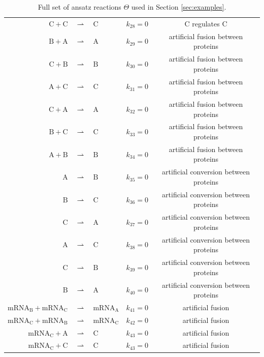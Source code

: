 \documentclass[oneside, abstracton, titlepage]{scrartcl}
\begin{document}
\begin{table}[h]
{\begin{tabular}{rclcc}
				$\mathrm{C} + \mathrm{C}$ &$\rightharpoonup$& $\mathrm{C}$ & $k_{28} = 0$ & $\mathrm{C}$ regulates $\mathrm{C}$\\
				$\mathrm{B} + \mathrm{A}$ &$\rightharpoonup$& $\mathrm{A}$ & $k_{29} = 0$ & artificial fusion between proteins\\
				$\mathrm{C} + \mathrm{B}$ &$\rightharpoonup$& $\mathrm{B}$ & $k_{30} = 0$ & artificial fusion between proteins\\
				$\mathrm{A} + \mathrm{C}$ &$\rightharpoonup$& $\mathrm{C}$ & $k_{31} = 0$ & artificial fusion between proteins\\
				$\mathrm{C} + \mathrm{A}$ &$\rightharpoonup$& $\mathrm{A}$ & $k_{32} = 0$ & artificial fusion between proteins\\
				$\mathrm{B} + \mathrm{C}$ &$\rightharpoonup$& $\mathrm{C}$ & $k_{33} = 0$ & artificial fusion between proteins\\
				$\mathrm{A} + \mathrm{B}$ &$\rightharpoonup$& $\mathrm{B}$ & $k_{34} = 0$ & artificial fusion between proteins\\
				$\mathrm{A}$ &$\rightharpoonup$& $\mathrm{B}$ & $k_{35} = 0$ & artificial conversion between proteins\\
				$\mathrm{B}$ &$\rightharpoonup$& $\mathrm{C}$ & $k_{36} = 0$ & artificial conversion between proteins\\
				$\mathrm{C}$ &$\rightharpoonup$& $\mathrm{A}$ & $k_{37} = 0$ & artificial conversion between proteins\\
				$\mathrm{A}$ &$\rightharpoonup$& $\mathrm{C}$ & $k_{38} = 0$ & artificial conversion between proteins\\
				$\mathrm{C}$ &$\rightharpoonup$& $\mathrm{B}$ & $k_{39} = 0$ & artificial conversion between proteins\\
				$\mathrm{B}$ &$\rightharpoonup$& $\mathrm{A}$ & $k_{40} = 0$ & artificial conversion between proteins\\
				$\mathrm{mRNA}_\mathrm{B} + \mathrm{mRNA}_\mathrm{C}$ &$\rightharpoonup$& $\mathrm{mRNA}_\mathrm{A}$ & $k_{41} = 0$ & artificial fusion\\
				$\mathrm{mRNA}_\mathrm{C} + \mathrm{mRNA}_\mathrm{B}$ &$\rightharpoonup$& $\mathrm{mRNA}_\mathrm{C}$ & $k_{42} = 0$ & artificial fusion\\
				$\mathrm{mRNA}_\mathrm{C} + \mathrm{A}$ &$\rightharpoonup$& $\mathrm{C}$ & $k_{43} = 0$ & artificial fusion\\
				$\mathrm{mRNA}_\mathrm{C} + \mathrm{C}$ &$\rightharpoonup$& $\mathrm{C}$ & $k_{43} = 0$ & artificial fusion
			\end{tabular}
		}
		\caption{Full set of ansatz reactions $\Theta$ used in Section \ref{sec:examples}.}
		\label{tab:reaction-library}
	\end{table}
\end{document}

